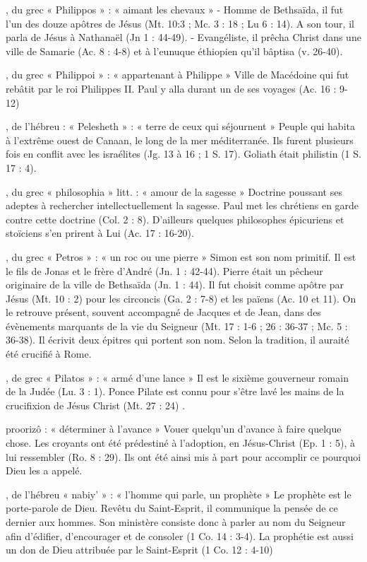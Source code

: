 \begin{multicols}{2}
, du grec « Philippos » : « aimant les chevaux »
- Homme de Bethsaïda, il fut l'un des douze apôtres de Jésus (Mt. 10:3 ; Mc. 3 : 18 ; Lu 6 : 14). A son tour, il parla de Jésus à Nathanaël (Jn 1 : 44-49).
- Evangéliste, il prêcha Christ dans une ville de Samarie (Ac. 8 : 4-8) et à l'eunuque éthiopien qu'il bâptisa (v. 26-40).


, du grec « Philippoi » : « appartenant à Philippe »
Ville de Macédoine qui fut rebâtit par le roi Philippes II. Paul y alla durant un de ses voyages (Ac. 16 : 9-12)


, de l'hébreu : « Pelesheth » : « terre de ceux qui séjournent »
Peuple qui habita à l'extrême ouest de Canaan, le long de la mer méditerranée. Ils furent plusieurs fois en conflit avec les israélites (Jg. 13 à 16 ; 1 S. 17). Goliath était philistin (1 S. 17 : 4).


, du grec « philosophia » litt. : « amour de la sagesse »
Doctrine poussant ses adeptes à rechercher intellectuellement la sagesse. Paul met les chrétiens en garde contre cette doctrine (Col. 2 : 8). D'ailleurs quelques philosophes épicuriens et stoïciens s'en prirent à Lui (Ac. 17 : 16-20).


, du grec « Petros » : « un roc ou une pierre »
Simon est son nom primitif. Il est le fils de Jonas et le frère d'André (Jn. 1 : 42-44). Pierre était un pêcheur originaire de la ville de Bethsaïda (Jn. 1 : 44). Il fut choisit comme apôtre par Jésus (Mt. 10 : 2) pour les circoncis (Ga. 2 : 7-8) et les païens (Ac. 10 et 11). On le retrouve présent, souvent accompagné de Jacques et de Jean, dans des évènements marquants de la vie du Seigneur (Mt. 17 : 1-6 ; 26 : 36-37 ; Mc. 5 : 36-38). Il écrivit deux épitres qui portent son nom. Selon la tradition, il auraité été crucifié à Rome.


, de grec « Pilatos » : « armé d'une lance »
Il est le sixième gouverneur romain de la Judée (Lu. 3 : 1). Ponce Pilate est connu pour s'être lavé les mains de la crucifixion de Jésus Christ (Mt. 27 : 24) .


proorizô : « déterminer à l'avance »
Vouer quelqu’un d'avance à faire quelque chose. Les croyants ont été prédestiné à l'adoption, en Jésus-Christ (Ep. 1 : 5), à lui ressembler (Ro. 8 : 29). Ils ont été ainsi mis à part pour accomplir ce pourquoi Dieu les a appelé.


, de l'hébreu « nabiy' » : « l'homme qui parle, un prophète »
Le prophète est le porte-parole de Dieu. Revêtu du Saint-Esprit, il communique la pensée de ce dernier aux hommes.
Son ministère consiste donc à parler au nom du Seigneur afin d'édifier, d'encourager et de consoler (1 Co. 14 : 3-4).
La prophétie est aussi un don de Dieu attribuée par le Saint-Esprit (1 Co. 12 : 4-10)



\end{multicols}
